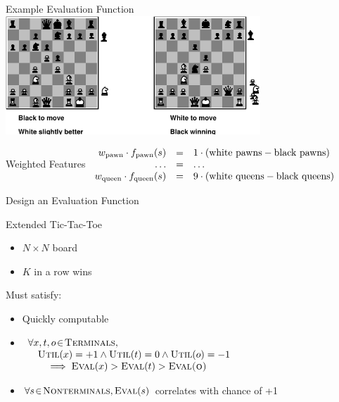 \documentclass[14pt]{beamer}
\begin{document}
\begin{frame}{Example Evaluation Function}
	\centering
	\includegraphics[height=1.75in]{chess-evaluation.pdf}
	\begin{block}{Weighted Features}
		\small
		$
		\begin{array}{rcl}
			w_{\mbox{\scriptsize pawn}}  \cdot f_{\mbox{\scriptsize pawn}}(s)  & = & 1 \cdot (\mbox{white pawns} - \mbox{black pawns})   \\
			\ldots                                                             & = & \ldots \\
			w_{\mbox{\scriptsize queen}} \cdot f_{\mbox{\scriptsize queen}}(s) & = & 9 \cdot (\mbox{white queens} - \mbox{black queens})
		\end{array}
		$
	\end{block}
\end{frame}
\begin{frame}[label=evaluation-function-exercise]{Design an Evaluation Function}
\begin{block}{Extended Tic-Tac-Toe}
\begin{itemize}
\item $N \times N$ board
\item $K$ in a row wins
\end{itemize}
\end{block}
\bigskip
Must satisfy:
\begin{itemize}
\item Quickly computable
\item 
$\begin{array}[t]{lll}
\lefteqn{\forall x,t,o \! \in \! \textsc{Terminals},}\\
& \lefteqn{\textsc{Util}(x) = +1 \wedge \textsc{Util}(t) = 0 \wedge \textsc{Util}(o) = -1} \\
& & \implies  \textsc{Eval}(x) > \textsc{Eval}(t) > \textsc{Eval(o)}
\end{array}$ 
\item
$\forall s \! \in \! \textsc{Nonterminals}, \textsc{Eval}(s)$ correlates with chance of +1
\end{itemize}
\end{frame}
\end{document}
